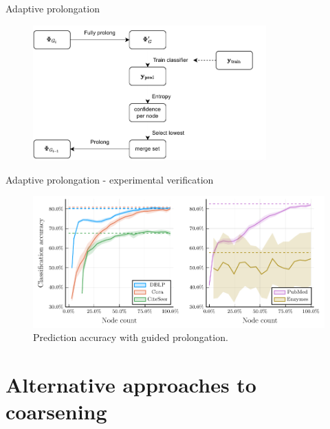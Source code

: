 \documentclass[10pt]{beamer}
\begin{document}
\begin{frame}{Adaptive prolongation}
	\begin{figure}
		\centering
		\includegraphics[width=0.8\textwidth]{images/adaptive-prolongation/adaptive-prolongation.pdf}
	\end{figure}
\end{frame}

\begin{frame}{Adaptive prolongation - experimental verification}
	\begin{figure}
		\centering
		\includegraphics[width=\textwidth]{images/adaptive-coarsening/adaptive-coarsening.pdf}
		\caption{Prediction accuracy with guided prolongation.}
	\end{figure}
\end{frame}

\section{Alternative approaches to coarsening}
\end{document}
